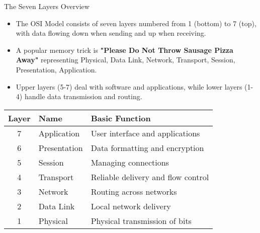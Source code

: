 \documentclass[aspectratio=169]{beamer}
\begin{document}
\begin{frame}{The Seven Layers Overview}

\begin{itemize}
    \item The OSI Model consists of seven layers numbered from 1 (bottom) to 7 (top), with data flowing down when sending and up when receiving.
    \item A popular memory trick is \textbf{"Please Do Not Throw Sausage Pizza Away"} representing Physical, Data Link, Network, Transport, Session, Presentation, Application.
    \item Upper layers (5-7) deal with software and applications, while lower layers (1-4) handle data transmission and routing.
\end{itemize}

\vspace{0.2cm}

\begin{table}
\centering
\small
\begin{tabular}{|c|l|l|}
\hline
\rowcolor{networkblue!30}
\textbf{Layer} & \textbf{Name} & \textbf{Basic Function} \\ \hline
7 & Application & User interface and applications \\ \hline
\rowcolor{gray!10}
6 & Presentation & Data formatting and encryption \\ \hline
5 & Session & Managing connections \\ \hline
\rowcolor{gray!10}
4 & Transport & Reliable delivery and flow control \\ \hline
3 & Network & Routing across networks \\ \hline
\rowcolor{gray!10}
2 & Data Link & Local network delivery \\ \hline
1 & Physical & Physical transmission of bits \\ \hline
\end{tabular}
\end{table}

\end{frame}
\end{document}
